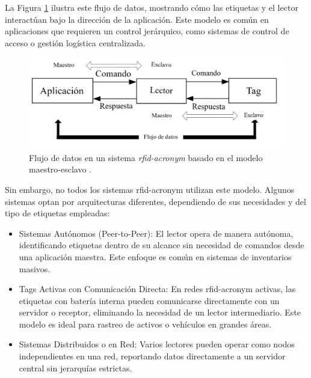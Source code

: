 La Figura \ref{fig:MasterSlaveFlow} ilustra este flujo de datos, mostrando cómo las etiquetas y el lector interactúan bajo la dirección de la aplicación. Este modelo es común en aplicaciones que requieren un control jerárquico, como sistemas de control de acceso o gestión logística centralizada.

\begin{figure}[H]
\leavevmode
\begin{minipage}{\textwidth}
\begin{center}
\includegraphics[scale=0.3]{./capitulo_02/figures/RFID_MSf.png}
\caption{Flujo de datos en un sistema \textit{\acrshort{rfid-acronym}} basado en el modelo maestro-esclavo \cite{Mechanismiot}. \label{fig:MasterSlaveFlow}}
\end{center}
\end{minipage}
\end{figure}

Sin embargo, no todos los sistemas \acrshort{rfid-acronym} utilizan este modelo. Algunos sistemas optan por arquitecturas diferentes, dependiendo de sus necesidades y del tipo de etiquetas empleadas:
\begin{itemize}
    \item Sistemas Autónomos (Peer-to-Peer): El lector opera de manera autónoma, identificando etiquetas dentro de su alcance sin necesidad de comandos desde una aplicación maestra. Este enfoque es común en sistemas de inventarios masivos.
    \item Tags Activas con Comunicación Directa: En redes \acrshort{rfid-acronym} activas, las etiquetas con batería interna pueden comunicarse directamente con un servidor o receptor, eliminando la necesidad de un lector intermediario. Este modelo es ideal para rastreo de activos o vehículos en grandes áreas.
    \item Sistemas Distribuidos o en Red: Varios lectores pueden operar como nodos independientes en una red, reportando datos directamente a un servidor central sin jerarquías estrictas.
\end{itemize}

